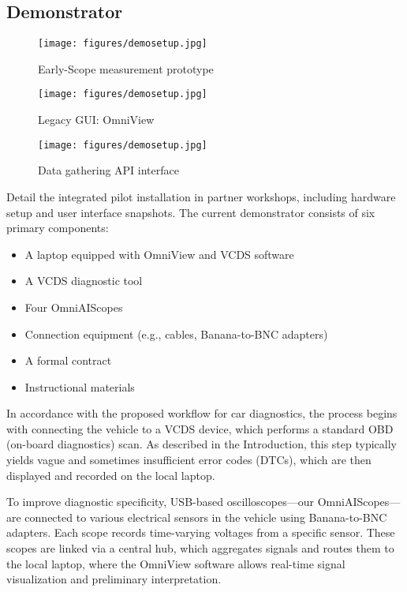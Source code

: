 \subsection{Demonstrator}
\begin{figure}[ht]
  \centering
  \texttt{[image: figures/demosetup.jpg]}
  \caption{Early-Scope measurement prototype}
  \label{fig:early-scope}
\end{figure}

\begin{figure}[ht]
  \centering
  \texttt{[image: figures/demosetup.jpg]}
  \caption{Legacy GUI: OmniView}
  \label{fig:gui}
\end{figure}

\begin{figure}[ht]
  \centering
  \texttt{[image: figures/demosetup.jpg]}
  \caption{Data gathering API interface}
  \label{fig:data-api}
\end{figure}
Detail the integrated pilot installation in partner workshops, including hardware setup and user interface snapshots.
The current demonstrator consists of six primary components:
\begin{itemize}
  \item A laptop equipped with OmniView and VCDS software
  \item A VCDS diagnostic tool
  \item Four OmniAIScopes
  \item Connection equipment (e.g., cables, Banana-to-BNC adapters)
  \item A formal contract
  \item Instructional materials
\end{itemize}
In accordance with the proposed workflow for car diagnostics, the process begins with connecting the vehicle to a VCDS device, which performs a standard OBD (on-board diagnostics) scan. 
As described in the Introduction, this step typically yields vague and sometimes insufficient error codes (DTCs), which are then displayed and recorded on the local laptop.

To improve diagnostic specificity, USB-based oscilloscopes—our OmniAIScopes—are connected to various electrical sensors in the vehicle using Banana-to-BNC adapters. 
Each scope records time-varying voltages from a specific sensor. 
These scopes are linked via a central hub, which aggregates signals and routes them to the local laptop, where the OmniView software allows real-time signal visualization and preliminary interpretation.

